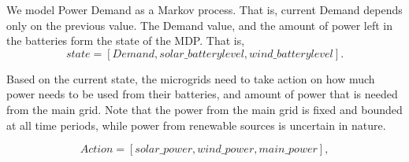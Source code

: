 \documentclass[conference]{IEEEtran}
\begin{document}
We model Power Demand as a Markov process. That is, current Demand depends only on the previous value. The Demand value, and the amount of power left in the batteries form the state of the MDP. That is, 
\begin{equation}
 state = [Demand, solar\_batterylevel, wind\_batterylevel].
\end{equation}

Based on the current state, the microgrids need to take action on how much power needs to be used from their batteries, and amount of power that is needed from the main grid. Note that the power from the main grid is fixed and bounded at all time periods, while power from renewable sources is uncertain in nature. 

\begin{equation}
Action = [solar\_power,wind\_power,main\_power],
\end{equation}
\end{document}
